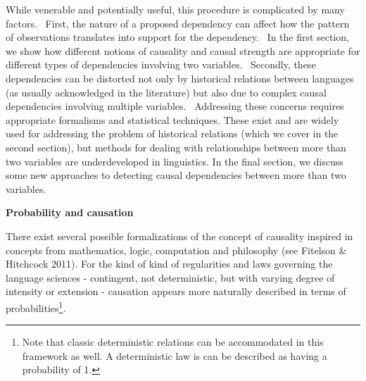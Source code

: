 \documentclass[11pt]{article}
\newenvironment{styleStandard}{\setlength\leftskip{0in}\setlength\rightskip{0in}\setlength\parindent{0in}\setlength\parfillskip{0pt plus 1fil}\setlength\parskip{0in plus 1pt}\writerlistparindent\writerlistleftskip\leavevmode\normalfont\normalsize\writerlistlabel\ignorespaces}{\unskip\vspace{0in plus 1pt}\par}
\newcommand\writerlistleftskip{}
\newcommand\writerlistparindent{}
\newcommand\writerlistlabel{}
\begin{document}
\begin{styleStandard}
While venerable and potentially useful, this procedure is complicated by many factors. \ First, the nature of a proposed dependency can affect how the pattern of observations translates into support for the dependency. \ In the first section, we show how different notions of causality and causal strength are appropriate for different types of dependencies involving two variables. \ Secondly, these dependencies can be distorted not only by historical relations between languages (as usually acknowledged in the literature) but also due to complex causal dependencies involving multiple variables. \ Addressing these concerns requires appropriate formalisms and statistical techniques. These exist and are widely used for addressing the problem of historical relations (which we cover in the second section), but methods for dealing with relationships between more than two variables are underdeveloped in linguistics. In the final section, we discuss some new approaches to detecting causal dependencies between more than two variables.
\end{styleStandard}


\begin{styleStandard}
\textbf{Probability and causation}
\end{styleStandard}


\begin{styleStandard}
There exist several possible formalizations of the concept of causality inspired in concepts from mathematics, logic, computation and philosophy (see Fitelson \& Hitchcock 2011). For the kind of kind of regularities and laws governing the language sciences - contingent, not deterministic, but with varying degree of intensity or extension - causation appears more naturally described in terms of probabilities\footnote{ Note that classic deterministic relations can be accommodated in this framework as well. A deterministic law is can be described as having a probability of 1.\par }. 
\end{styleStandard}
\end{document}
